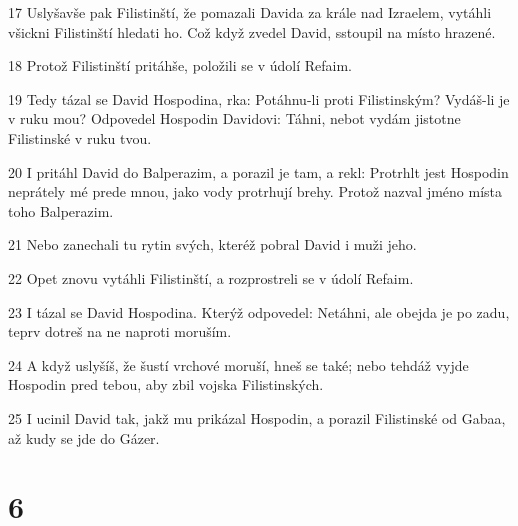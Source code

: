 \par 17 Uslyšavše pak Filistinští, že pomazali Davida za krále nad Izraelem, vytáhli všickni Filistinští hledati ho. Což když zvedel David, sstoupil na místo hrazené.
\par 18 Protož Filistinští pritáhše, položili se v údolí Refaim.
\par 19 Tedy tázal se David Hospodina, rka: Potáhnu-li proti Filistinským? Vydáš-li je v ruku mou? Odpovedel Hospodin Davidovi: Táhni, nebot vydám jistotne Filistinské v ruku tvou.
\par 20 I pritáhl David do Balperazim, a porazil je tam, a rekl: Protrhlt jest Hospodin neprátely mé prede mnou, jako vody protrhují brehy. Protož nazval jméno místa toho Balperazim.
\par 21 Nebo zanechali tu rytin svých, kteréž pobral David i muži jeho.
\par 22 Opet znovu vytáhli Filistinští, a rozprostreli se v údolí Refaim.
\par 23 I tázal se David Hospodina. Kterýž odpovedel: Netáhni, ale obejda je po zadu, teprv dotreš na ne naproti moruším.
\par 24 A když uslyšíš, že šustí vrchové moruší, hneš se také; nebo tehdáž vyjde Hospodin pred tebou, aby zbil vojska Filistinských.
\par 25 I ucinil David tak, jakž mu prikázal Hospodin, a porazil Filistinské od Gabaa, až kudy se jde do Gázer.

\chapter{6}

